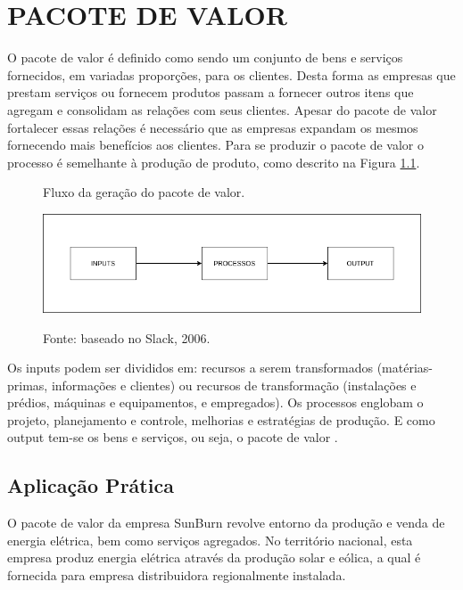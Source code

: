 \chapter{PACOTE DE VALOR}
\label{chap:pacotedevalor}

O pacote de valor é definido como sendo um conjunto de bens e serviços fornecidos, em variadas proporções, para os clientes. Desta forma as empresas que prestam serviços ou fornecem produtos passam a fornecer outros itens que agregam e consolidam as relações com seus clientes.
Apesar do pacote de valor fortalecer essas relações é necessário que as empresas expandam os mesmos fornecendo mais benefícios aos clientes.
Para se produzir o pacote de valor o processo é semelhante à produção de produto, como descrito na Figura \ref{fig:pacotevalor}.

\begin{figure}[H]
    \caption{Fluxo da geração do pacote de valor.}
    \includegraphics[width=\textwidth]{images/pacote_valor.png}
    \label{fig:pacotevalor}
    \caption*{Fonte: baseado no Slack, 2006.}

\end{figure}

Os inputs podem ser divididos em: recursos a serem transformados (matérias-primas, informações e clientes) ou recursos de transformação (instalações e prédios, máquinas e equipamentos, e empregados). Os processos englobam o projeto, planejamento e controle, melhorias e estratégias de produção. E como output tem-se os bens e serviços, ou seja, o pacote de valor \cite{slack2006administraccao}.
\section{Aplicação Prática}
\label{sec:app1}
O pacote de valor da empresa SunBurn revolve entorno da produção e venda de energia elétrica, bem como serviços agregados. No território nacional, esta empresa produz energia elétrica através da produção solar e eólica, a qual é fornecida para empresa distribuidora regionalmente instalada. 

